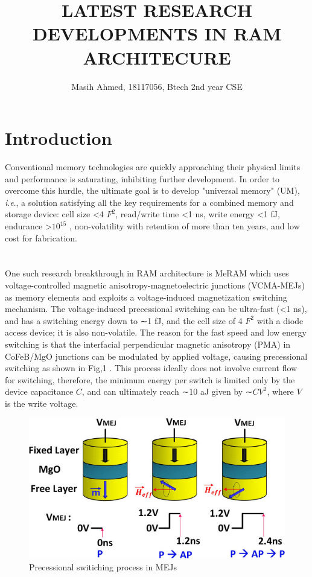 \documentclass[a4paper, 12pt]{article}
\newcommand{\ie}{\textit{i}.\textit{e}., }
\begin{document}
\title{LATEST RESEARCH DEVELOPMENTS IN RAM ARCHITECURE}
\date{}
\author{Masih Ahmed, 18117056, Btech 2nd year CSE}
\maketitle

\section{Introduction}
Conventional memory technologies are quickly approaching their physical limits and performance is saturating, inhibiting further development. In order to overcome this hurdle, the ultimate goal is to develop "universal memory" (UM), \ie a solution satisfying all the key requirements for a combined memory and storage device: cell size <4 $F^2$, read/write time <1 ns, write energy <1 fJ, endurance >$10^15$ , non-volatility with retention of more than ten years, and low cost for fabrication. 
\\
\\
\\
One such research breakthrough in RAM architecture is MeRAM which uses voltage-controlled magnetic anisotropy-magnetoelectric junctions (VCMA-MEJs) as memory elements and exploits a voltage-induced magnetization switching mechanism. The voltage-induced precessional switching can be ultra-fast (<1 ns), and has a switching energy down to ∼1 fJ, and the cell size of 4 $F^2$ with a diode access device; it is also non-volatile. The reason for the fast speed and low energy switching is that the interfacial perpendicular magnetic anisotropy (PMA) in CoFeB/MgO junctions can be modulated by applied voltage, causing precessional switching as shown in Fig,1 . This process ideally does not involve current flow for switching, therefore, the minimum energy per switch is limited only by the device capacitance $C$, and can ultimately reach ∼10 aJ given by ∼$CV^2$, where $V$ is the write voltage.

	\begin{figure}[H]
	\begin{center}
		\includegraphics[scale=0.5]{Fig1.jpg}
		\caption {Precessional switiching process in MEJs}	
	\end{center}
	\end{figure}
\end{document}
